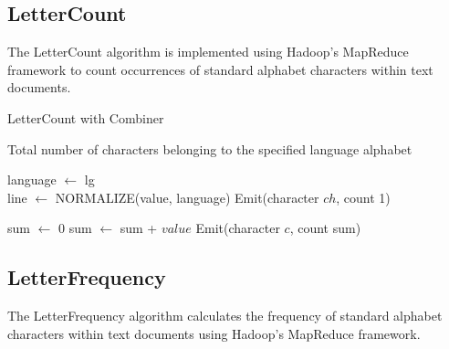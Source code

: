     

\subsection{LetterCount}
The LetterCount algorithm is implemented using Hadoop's MapReduce framework to count occurrences of standard alphabet characters within text documents. \\

\begin{algorithm}
    \caption{LetterCount with Combiner}
    \begin{algorithmic}[1]
        \Ensure Total number of characters belonging to the specified language alphabet

        \Statex

            \State language $\gets$ lg 
        \EndMethod\\

            \State line $\gets$ NORMALIZE(value, language) 
                \State Emit(character $ch$, count 1) 
            \EndFor
        \EndMethod
        \EndClass

        \Statex

            \State sum $\gets$ 0 
             
                \State sum $\gets$ sum + $value$
            \EndFor
            \State Emit(character $c$, count sum) 
        \EndMethod
        \EndClass

    \end{algorithmic}
\end{algorithm}

\newpage

\subsection{LetterFrequency}
The LetterFrequency algorithm calculates the frequency of standard alphabet characters within text documents using Hadoop's MapReduce framework. \\


